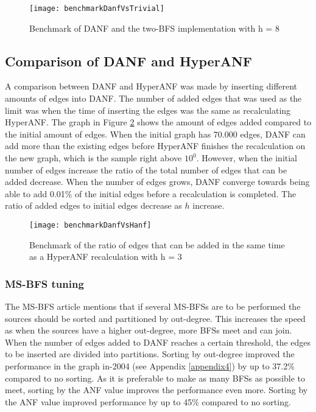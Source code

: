\begin{figure}[h]
\centering
\texttt{[image: benchmarkDanfVsTrivial]}    
\captionsetup{justification=centering}
\caption {Benchmark of DANF and the two-BFS implementation with h = 8}
\label{fig:benchmarkDanfVsTrivial}
\end{figure}


\subsection{Comparison of DANF and HyperANF}
A comparison between DANF and HyperANF was made by inserting different amounts of edges into DANF. The number of added edges that was used as the limit was when the time of inserting the edges was the same as recalculating HyperANF. The graph in Figure \ref{fig:benchmarkDanfVsHanf} shows the amount of edges added compared to the initial amount of edges. When the initial graph has 70.000 edges, DANF can add more than the existing edges before HyperANF finishes the recalculation on the new graph, which is the sample right above $10^0$. However, when the initial number of edges increase the ratio of the total number of edges that can be added decrease. When the number of edges grows, DANF converge towards being able to add 0.01\% of the initial edges before a recalculation is completed. The ratio of added edges to initial edges decrease as $h$ increase.

\begin{figure}[h]
\centering
\texttt{[image: benchmarkDanfVsHanf]}    
\captionsetup{justification=centering}
\caption {Benchmark of the ratio of edges that can be added in the same time as a HyperANF recalculation with h = 3}
\label{fig:benchmarkDanfVsHanf}
\end{figure}

\subsubsection{MS-BFS tuning}
The MS-BFS article \cite{msbfs} mentions that if several MS-BFSs are to be performed the sources should be sorted and partitioned by out-degree. This increases the speed as when the sources have a higher out-degree, more BFSs meet and can join. When the number of edges added to DANF reaches a certain threshold, the edges to be inserted are divided into partitions. Sorting by out-degree improved the performance in the graph in-2004 (see Appendix \ref{appendix4}) by up to 37.2\% compared to no sorting. As it is preferable to make as many BFSs as possible to meet, sorting by the ANF value improves the performance even more. Sorting by the ANF value improved performance by up to 45\% compared to no sorting.   


